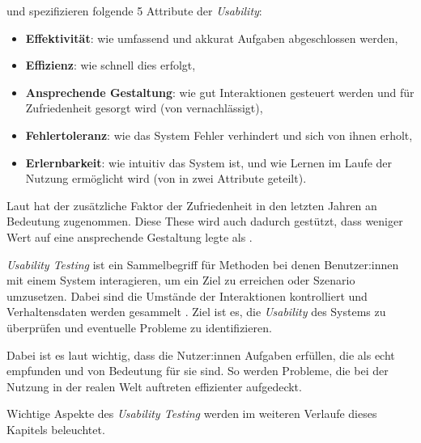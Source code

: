 \textcite{quesenberyDimensionsUsability2003} und \textcite{nielsenUsabilityEngineering1994} spezifizieren folgende 5 Attribute der \textit{Usability}:
\begin{itemize}
  \item \textbf{Effektivität}: wie umfassend und akkurat Aufgaben abgeschlossen werden,
  \item \textbf{Effizienz}: wie schnell dies erfolgt,
  \item \textbf{Ansprechende Gestaltung}: wie gut Interaktionen gesteuert werden und für Zufriedenheit gesorgt wird (von \citeauthor{nielsenUsabilityEngineering1994} vernachlässigt),
  \item \textbf{Fehlertoleranz}: wie das System Fehler verhindert und sich von ihnen erholt,
  \item \textbf{Erlernbarkeit}: wie intuitiv das System ist, und wie Lernen im Laufe der Nutzung ermöglicht wird (von \citeauthor{nielsenUsabilityEngineering1994} in zwei Attribute geteilt).
\end{itemize}
Laut \textcite{barnumUsabilityTesting2021} hat der zusätzliche Faktor der Zufriedenheit in den letzten Jahren an Bedeutung zugenommen. Diese These wird auch dadurch gestützt, dass \textcite{nielsenUsabilityEngineering1994} weniger Wert auf eine ansprechende Gestaltung legte als \textcite{quesenberyDimensionsUsability2003}.

\textit{Usability Testing} ist ein Sammelbegriff für Methoden bei denen Benutzer:innen mit einem System interagieren, um ein Ziel zu erreichen oder Szenario umzusetzen. Dabei sind die Umstände der Interaktionen kontrolliert und Verhaltensdaten werden gesammelt \parencite{wichanskyUsabilityTesting2000}. Ziel ist es, die \textit{Usability} des Systems zu überprüfen und eventuelle Probleme zu identifizieren.

Dabei ist es laut \textcite{barnumUsabilityTesting2021} wichtig, dass die Nutzer:innen Aufgaben erfüllen, die als echt empfunden und von Bedeutung für sie sind. So werden Probleme, die bei der Nutzung in der realen Welt auftreten effizienter aufgedeckt.

Wichtige Aspekte des \textit{Usability Testing} werden im weiteren Verlaufe dieses Kapitels beleuchtet.
